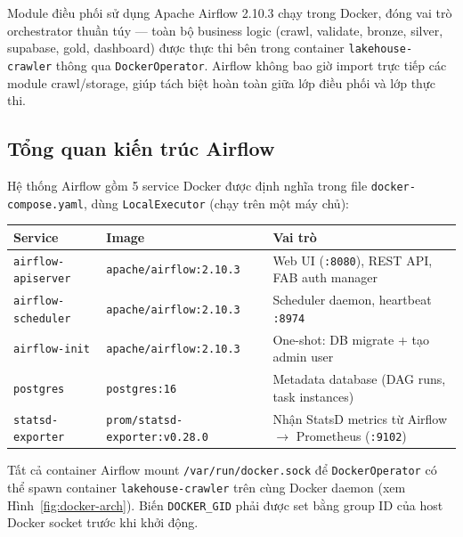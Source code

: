 Module điều phối sử dụng Apache Airflow 2.10.3 chạy trong Docker, đóng vai trò
orchestrator thuần túy --- toàn bộ business logic (crawl, validate, bronze, silver,
supabase, gold, dashboard) được thực thi bên trong container \texttt{lakehouse-crawler}
thông qua \texttt{DockerOperator}. Airflow không bao giờ import trực tiếp các module
crawl/storage, giúp tách biệt hoàn toàn giữa lớp điều phối và lớp thực thi.

\subsection{Tổng quan kiến trúc Airflow}
\label{subsec:airflow-arch}

Hệ thống Airflow gồm 5 service Docker được định nghĩa trong
file \texttt{docker-compose.yaml},
dùng \texttt{LocalExecutor} (chạy trên một máy chủ):

\begin{longtable}{p{4.2cm} p{3cm} p{7cm}}
\toprule
\textbf{Service} & \textbf{Image} & \textbf{Vai trò} \\
\midrule
\endhead
\texttt{airflow-apiserver} & \texttt{apache/airflow:2.10.3} & Web UI (\texttt{:8080}), REST API, FAB auth manager \\
\texttt{airflow-scheduler} & \texttt{apache/airflow:2.10.3} & Scheduler daemon, heartbeat \texttt{:8974} \\
\texttt{airflow-init} & \texttt{apache/airflow:2.10.3} & One-shot: DB migrate + tạo admin user \\
\texttt{postgres} & \texttt{postgres:16} & Metadata database (DAG runs, task instances) \\
\texttt{statsd-exporter} & \texttt{prom/statsd-exporter:v0.28.0} & Nhận StatsD metrics từ Airflow $\to$ Prometheus (\texttt{:9102}) \\
\bottomrule
\end{longtable}

Tất cả container Airflow mount \texttt{/var/run/docker.sock} để \texttt{DockerOperator}
có thể spawn container \texttt{lakehouse-crawler} trên cùng Docker daemon (xem
Hình~\ref{fig:docker-arch}). Biến \texttt{DOCKER\_GID} phải được set bằng group ID
của host Docker socket trước khi khởi động.

